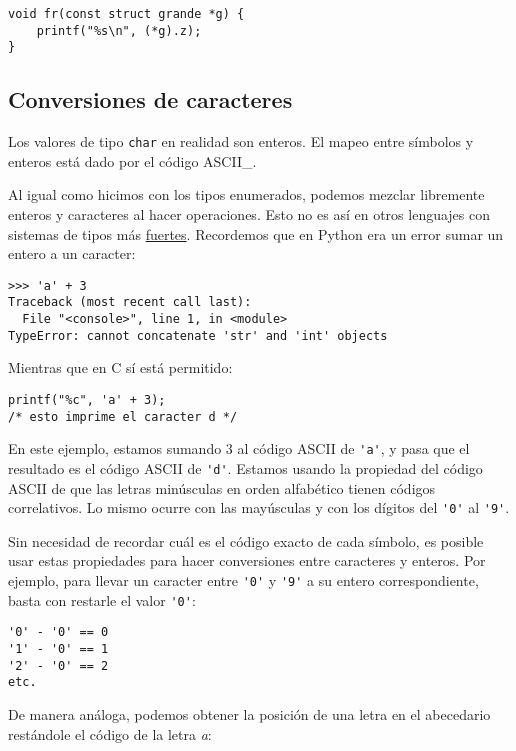 \begin{lstlisting}
void fr(const struct grande *g) {
    printf("%s\n", (*g).z);
}
\end{lstlisting}

\subsection{Conversiones de caracteres}

Los valores de tipo \lstinline!char! en realidad son enteros. El mapeo
entre símbolos y enteros está dado por el código ASCII\_.

Al igual como hicimos con los tipos enumerados, podemos mezclar
libremente enteros y caracteres al hacer operaciones. Esto no es así en
otros lenguajes con sistemas de tipos más
\href{http://en.wikipedia.org/wiki/Strong\_typing}{fuertes}. Recordemos
que en Python era un error sumar un entero a un caracter:

\begin{lstlisting}
>>> 'a' + 3
Traceback (most recent call last):
  File "<console>", line 1, in <module>
TypeError: cannot concatenate 'str' and 'int' objects
\end{lstlisting}

Mientras que en C sí está permitido:

\begin{lstlisting}
printf("%c", 'a' + 3);
/* esto imprime el caracter d */
\end{lstlisting}

En este ejemplo, estamos sumando 3 al código ASCII de \lstinline!'a'!, y
pasa que el resultado es el código ASCII de \lstinline!'d'!. Estamos
usando la propiedad del código ASCII de que las letras minúsculas en
orden alfabético tienen códigos correlativos. Lo mismo ocurre con las
mayúsculas y con los dígitos del \lstinline!'0'! al \lstinline!'9'!.

Sin necesidad de recordar cuál es el código exacto de cada símbolo, es
posible usar estas propiedades para hacer conversiones entre caracteres
y enteros. Por ejemplo, para llevar un caracter entre \lstinline!'0'! y
\lstinline!'9'! a su entero correspondiente, basta con restarle el valor
\lstinline!'0'!:

\begin{lstlisting}
'0' - '0' == 0
'1' - '0' == 1
'2' - '0' == 2
etc.
\end{lstlisting}

De manera análoga, podemos obtener la posición de una letra en el
abecedario restándole el código de la letra \emph{a}:

